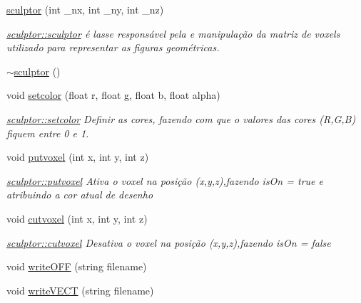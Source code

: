 \begin{DoxyCompactItemize}
\item 
\mbox{\hyperlink{classsculptor_a7ee1a5fad8c2976b8cc0d781eab131fa}{sculptor}} (int \+\_\+nx, int \+\_\+ny, int \+\_\+nz)
\begin{DoxyCompactList}\small\item\em \mbox{\hyperlink{classsculptor_a7ee1a5fad8c2976b8cc0d781eab131fa}{sculptor\+::sculptor}} é lasse responsável pela e manipulação da matriz de voxels utilizado para representar as figuras geométricas. \end{DoxyCompactList}\item 
\mbox{\hyperlink{classsculptor_a34706c529c6ce1129328ab5a6a4ddcef}{$\sim$sculptor}} ()
\item 
void \mbox{\hyperlink{classsculptor_af0f153c78da4204025e19f9b3f342a19}{setcolor}} (float r, float g, float b, float alpha)
\begin{DoxyCompactList}\small\item\em \mbox{\hyperlink{classsculptor_af0f153c78da4204025e19f9b3f342a19}{sculptor\+::setcolor}} Definir as cores, fazendo com que o valores das cores (R,G,B) fiquem entre 0 e 1. \end{DoxyCompactList}\item 
void \mbox{\hyperlink{classsculptor_a08d37a134605421ffc6a4cf82f0a9c84}{putvoxel}} (int x, int y, int z)
\begin{DoxyCompactList}\small\item\em \mbox{\hyperlink{classsculptor_a08d37a134605421ffc6a4cf82f0a9c84}{sculptor\+::putvoxel}} Ativa o voxel na posição (x,y,z),fazendo is\+On = true e atribuindo a cor atual de desenho \end{DoxyCompactList}\item 
void \mbox{\hyperlink{classsculptor_a287e61d97f0b874c69af3e73758e3281}{cutvoxel}} (int x, int y, int z)
\begin{DoxyCompactList}\small\item\em \mbox{\hyperlink{classsculptor_a287e61d97f0b874c69af3e73758e3281}{sculptor\+::cutvoxel}} Desativa o voxel na posição (x,y,z),fazendo is\+On = false \end{DoxyCompactList}\item 
void \mbox{\hyperlink{classsculptor_a1a1381e10d55a53d5c76da607f0f3da0}{write\+O\+FF}} (string filename)
\item 
void \mbox{\hyperlink{classsculptor_aac8ef77c6002fec6c244c0f67e36e4c5}{write\+V\+E\+CT}} (string filename)
\end{DoxyCompactItemize}
